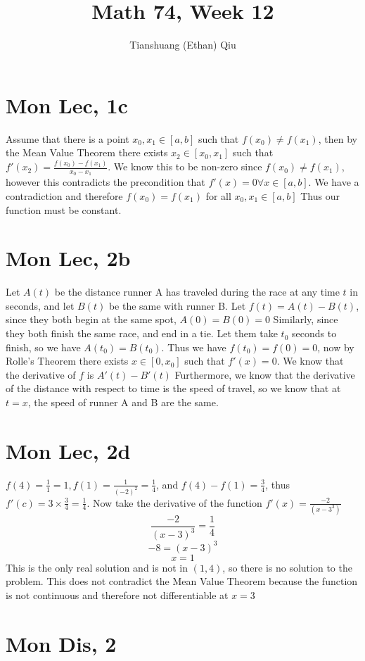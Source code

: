 \documentclass[12pt]{article}
\author{Tianshuang (Ethan) Qiu}
\begin{document}
\title{Math 74, Week 12}
\maketitle
\newpage

\section{Mon Lec, 1c}
Assume that there is a point $x_0, x_1 \in [a,b]$ such that $f(x_0) \not = f(x_1)$, then by the Mean Value Theorem there exists $x_2 \in [x_0, x_1]$ such that $f'(x_2)=\frac{f(x_0)-f(x_1)}{x_0-x_1}$. We know this to be non-zero since $f(x_0) \not = f(x_1)$, however this contradicts the precondition that $f'(x)=0 \forall x \in [a,b]$. We have a contradiction and therefore $f(x_0)=f(x_1)$ for all $x_0, x_1 \in [a,b]$
Thus our function must be constant.

\section{Mon Lec, 2b}
Let $A(t)$ be the distance runner A has traveled during the race at any time $t$ in seconds, and let $B(t)$ be the same with runner B. Let $f(t)=A(t)-B(t)$, since they both begin at the same spot, $A(0)=B(0)=0$
\newline
Similarly, since they both finish the same race, and end in a tie. Let them take $t_0$ seconds to finish, so we have $A(t_0)=B(t_0)$. Thus we have $f(t_0)=f(0)=0$, now by Rolle's Theorem there exists $x \in [0,x_0]$ such that $f'(x)=0$. We know that the derivative of $f$ is $A'(t)-B'(t)$
Furthermore, we know that the derivative of the distance with respect to time is the speed of travel, so we know that at $t=x$, the speed of runner A and B are the same.

\section{Mon Lec, 2d}
$f(4)=\frac{1}{1}=1, f(1)=\frac{1}{(-2)^2}=\frac{1}{4}$, and $f(4)-f(1)=\frac{3}{4}$, thus $f'(c)=3 \times \frac{3}{4} = \frac{1}{4}$. Now take the derivative of the function $f'(x)=\frac{-2}{(x-3^3)}$
$$\frac{-2}{(x-3)^3} = \frac{1}{4}$$
$$-8 = (x-3)^3$$
$$x=1$$
This is the only real solution and is not in $(1,4)$, so there is no solution to the problem. This does not contradict the Mean Value Theorem because the function is not continuous and therefore not differentiable at $x=3$
\newpage

\section{Mon Dis, 2}
\end{document}
